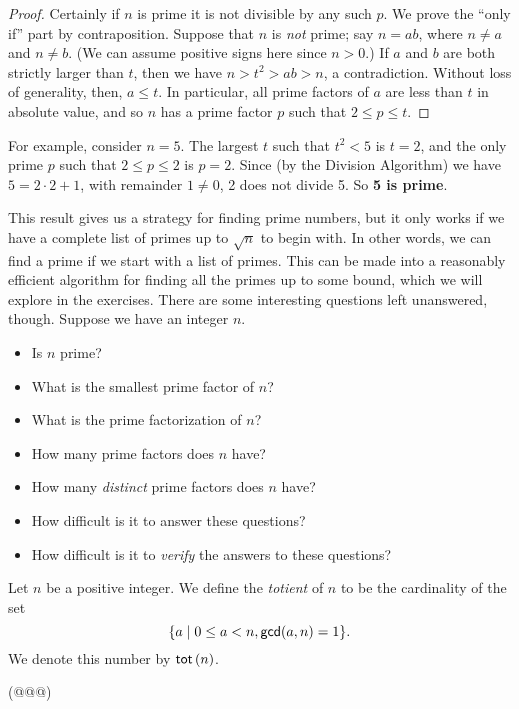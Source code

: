 \begin{proof}
Certainly if \(n\) is prime it is not divisible by any such \(p\).
We prove the ``only if'' part by contraposition.
Suppose that \(n\) is \emph{not} prime; say \(n = ab\), where \(n \neq a\) and \(n \neq b\).
(We can assume positive signs here since \(n > 0\).)
If \(a\) and \(b\) are both strictly larger than \(t\), then we have \(n > t^2 > ab > n\), a contradiction.
Without loss of generality, then, \(a \leq t\).
In particular, all prime factors of \(a\) are less than \(t\) in absolute value, and so \(n\) has a prime factor \(p\) such that \(2 \leq p \leq t\).
\end{proof}

For example, consider \(n = 5\).
The largest \(t\) such that \(t^2 < 5\) is \(t = 2\), and the only prime \(p\) such that \(2 \leq p \leq 2\) is \(p = 2\).
Since (by the Division Algorithm) we have \(5 = 2 \cdot 2 + 1\), with remainder \(1 \neq 0\), 2 does not divide 5.
So \textbf{5 is prime}.

This result gives us a strategy for finding prime numbers, but it only works if we have a complete list of primes up to \(\sqrt{n}\) to begin with.
In other words, we can find a prime if we start with a list of primes.
This can be made into a reasonably efficient algorithm for finding all the primes up to some bound, which we will explore in the exercises.
There are some interesting questions left unanswered, though.
Suppose we have an integer \(n\).
\begin{itemize}
\item Is \(n\) prime?
\item What is the smallest prime factor of \(n\)?
\item What is the prime factorization of \(n\)?
\item How many prime factors does \(n\) have?
\item How many \emph{distinct} prime factors does \(n\) have?
\item How difficult is it to answer these questions?
\item How difficult is it to \emph{verify} the answers to these questions?
\end{itemize}



\Exercises%

\begin{dfn}
Let \(n\) be a positive integer.
We define the \emph{totient} of \(n\) to be the cardinality of the set \[ \{ a \mid 0 \leq a < n, \mathsf{gcd}(a, n) = 1 \}. \]
We denote this number by \(\mathsf{tot}\left(n\right)\).
\end{dfn}

\begin{exercise}
(@@@)
\end{exercise}

